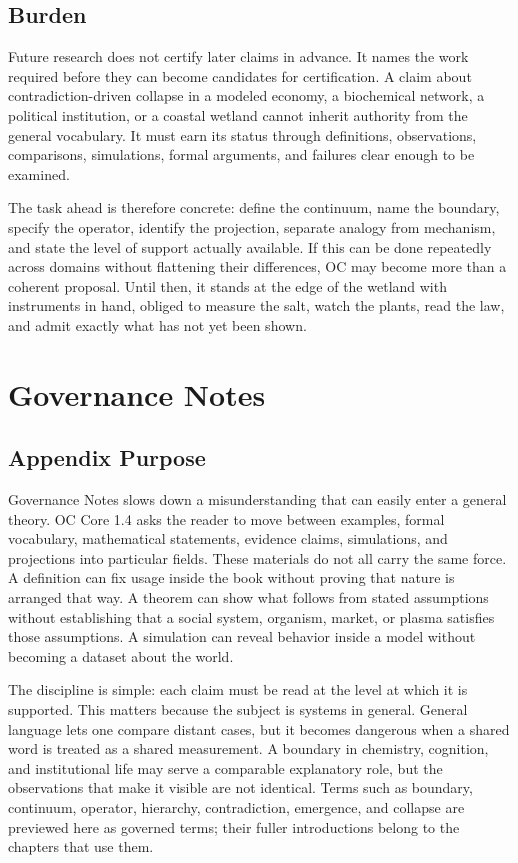 \documentclass[11pt,a4paper,openany]{book}
\begin{document}
\subsection{Burden}
Future research does not certify later claims in advance. It names the work required before they can become candidates for certification. A claim about contradiction-driven collapse in a modeled economy, a biochemical network, a political institution, or a coastal wetland cannot inherit authority from the general vocabulary. It must earn its status through definitions, observations, comparisons, simulations, formal arguments, and failures clear enough to be examined. \cite{haken_synergetics,nicolis_prigogine_selforg}\par
The task ahead is therefore concrete: define the continuum, name the boundary, specify the operator, identify the projection, separate analogy from mechanism, and state the level of support actually available. If this can be done repeatedly across domains without flattening their differences, OC may become more than a coherent proposal. Until then, it stands at the edge of the wetland with instruments in hand, obliged to measure the salt, watch the plants, read the law, and admit exactly what has not yet been shown.\par
\section{Governance Notes}
\subsection{Appendix Purpose}
Governance Notes slows down a misunderstanding that can easily enter a general theory. OC Core 1.4 asks the reader to move between examples, formal vocabulary, mathematical statements, evidence claims, simulations, and projections into particular fields. These materials do not all carry the same force. A definition can fix usage inside the book without proving that nature is arranged that way. A theorem can show what follows from stated assumptions without establishing that a social system, organism, market, or plasma satisfies those assumptions. A simulation can reveal behavior inside a model without becoming a dataset about the world. \cite{nicolis_prigogine_selforg,kauffman_autocatalytic}\par
The discipline is simple: each claim must be read at the level at which it is supported. This matters because the subject is systems in general. General language lets one compare distant cases, but it becomes dangerous when a shared word is treated as a shared measurement. A boundary in chemistry, cognition, and institutional life may serve a comparable explanatory role, but the observations that make it visible are not identical. Terms such as boundary, continuum, operator, hierarchy, contradiction, emergence, and collapse are previewed here as governed terms; their fuller introductions belong to the chapters that use them.\par
\end{document}
